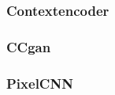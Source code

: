 	
	
	
	
	
	
	
	

      \subsubsection{Contextencoder}
      \subsubsection{CCgan}
      \subsubsection{PixelCNN}
      
  
 
